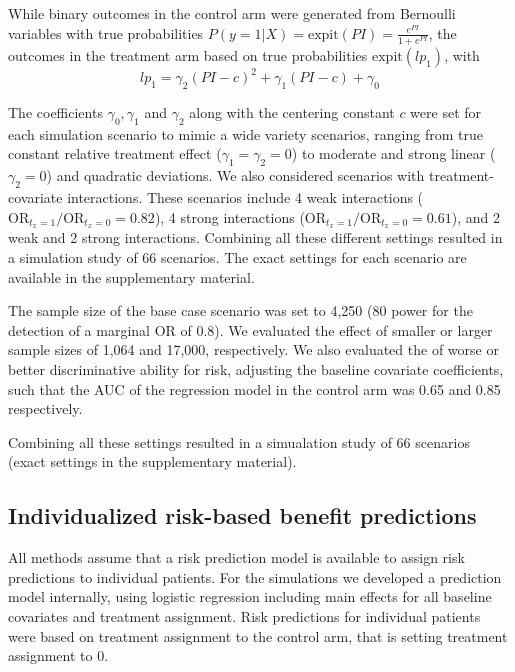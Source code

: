 \documentclass{article}
\begin{document}
While binary outcomes in the control arm were generated from Bernoulli
variables with true probabilities
\(P(y=1|X) = \text{expit}(PI)=\frac{e^{PI}}{1+e^{PI}}\), the outcomes in
the treatment arm based on true probabilities \(\text{expit}(lp_1)\),
with \[lp_1 = \gamma_2(PI-c)^2 + \gamma_1(PI-c) + \gamma_0\]

The coefficients \(\gamma_0,\gamma_1\) and \(\gamma_2\) along with the
centering constant \(c\) were set for each simulation scenario to mimic
a wide variety scenarios, ranging from true constant relative treatment
effect (\(\gamma_1=\gamma_2=0\)) to moderate and strong linear
(\(\gamma_2=0\)) and quadratic deviations. We also considered scenarios
with treatment-covariate interactions. These scenarios include 4 weak
interactions (\(\text{OR}_{t_x=1} / \text{OR}_{t_x=0}=0.82\)), 4 strong
interactions (\(\text{OR}_{t_x=1} / \text{OR}_{t_x=0}=0.61\)), and 2
weak and 2 strong interactions. Combining all these different settings
resulted in a simulation study of \(66\) scenarios. The exact settings
for each scenario are available in the supplementary material.

The sample size of the base case scenario was set to 4,250 (\(80%
\) power for the detection of a marginal OR of 0.8). We evaluated the
effect of smaller or larger sample sizes of 1,064 and 17,000,
respectively. We also evaluated the of worse or better discriminative
ability for risk, adjusting the baseline covariate coefficients, such
that the AUC of the regression model in the control arm was 0.65 and
0.85 respectively.

Combining all these settings resulted in a simualation study of 66
scenarios (exact settings in the supplementary material).

\hypertarget{individualized-risk-based-benefit-predictions}{%
\subsection{Individualized risk-based benefit
predictions}\label{individualized-risk-based-benefit-predictions}}

All methods assume that a risk prediction model is available to assign
risk predictions to individual patients. For the simulations we
developed a prediction model internally, using logistic regression
including main effects for all baseline covariates and treatment
assignment. Risk predictions for individual patients were based on
treatment assignment to the control arm, that is setting treatment
assignment to 0.
\end{document}
